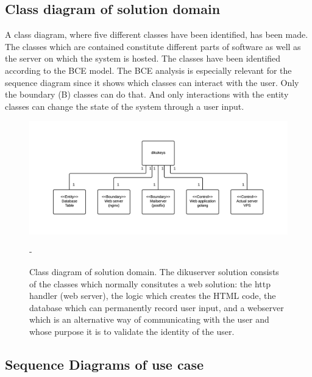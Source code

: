 \documentclass[11pt,a4paper]{report}
\begin{document}
\subsection{Class diagram of solution domain}\label{subsec:class_diagram}
A class diagram, where five different classes have been identified, has been made. The classes which are contained constitute different parts of software as well as the server on which the system is hosted. The classes have been identified according to the BCE model. The BCE analysis is especially relevant for the sequence diagram since it shows which classes can interact with the user. Only the boundary (B) classes can do that. And only interactions with the entity classes can change the state of the system through a user input.
\begin{figure}[H]
    \centering
    \includegraphics[width=1.2\textwidth]{pictures/class_diagram}
    \caption{Class diagram of solution domain. The dikuserver solution consists of the classes which normally consitutes a web solution: the http handler (web server), the logic which creates the HTML code, the database which can permanently record user input, and a webserver which is an alternative way of communicating with the user and whose purpose it is to validate the identity of the user.}     -    \label{fig:class_diagram}
\end{figure}
\subsection*{}

\subsection{Sequence Diagrams of use case}\label{subsec:Sequence_diagram_Use_case_model}
\end{document}
